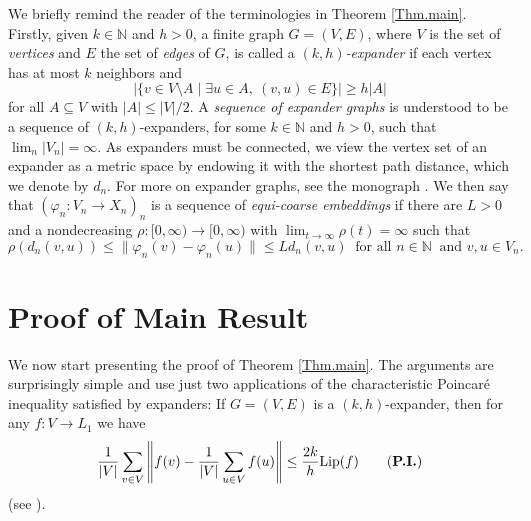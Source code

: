 \documentclass[11pt]{amsart}
\newcommand{\N}{\mathbb{N}}
\newcommand{\Lip}{\mathrm{Lip}}
\newtheorem{theorem}{Theorem}
\theoremstyle{definition}
\theoremstyle{remark}
\begin{document}


We briefly remind the reader of the terminologies in Theorem \ref{Thm.main}. Firstly, given $k\in\N$ and $h>0$, a finite   graph $G=(V,E)$, where $V$ is the set of \emph{vertices} and $E$ the set of \emph{edges} of $G$, is called a \emph{$(k,h)$-expander} if each vertex has at most $k$ neighbors and 
\[|\{v\in V\setminus A\mid \exists u\in A, \ (v,u)\in E\}|\geq h|A|\]
for all $A\subseteq V$ with $|A|\leq |V|/2$. A \emph{sequence of expander graphs} is understood to be a sequence of $(k,h)$-expanders, for some $k\in\N$ and $h>0$, such that $\lim_n|V_n|=\infty$. As expanders must be connected, we view the vertex set of an expander as a metric space by endowing it with the shortest path distance, which we denote by $d_n$.  For  more on expander graphs, see the monograph \cite{LubotzkyBook2010}. We then say that   $(\varphi_n\colon V_n\to X_n)_n$ is a sequence of  \emph{equi-coarse embeddings} if there are $L>0$ and a nondecreasing $\rho\colon [0,\infty)\to[0,\infty)$ with $\lim_{t\to \infty}\rho(t)=\infty$  such that 
\[\rho(d_n(v,u))\leq \|\varphi_n(v)-\varphi_n(u)\|\leq Ld_n(v,u)\ \text{ for all }n\in\N\ \text{ and } v,u\in V_n.\]

\section{Proof of Main Result}

We now start presenting the proof of Theorem \ref{Thm.main}. The arguments are surprisingly simple and use just two applications of the characteristic Poincaré inequality satisfied by expanders: If $G=(V,E)$ is a $(k,h)$-expander, then  for any $f\colon V\to L_1$ we have
     \begin{equation}\label{PIII}
\frac{1}{|V|}\sum_{v\in V}\left\|f(v)-\frac{1}{|V|}\sum_{u\in V}f(u)\right\|\leq \frac{2k}{h}\Lip(f) \tag{\textbf{P.I.}}
  \end{equation}
     (see \cite[Theorem 4.7]{Ostrovskii2013Book}).
     
\end{document}
